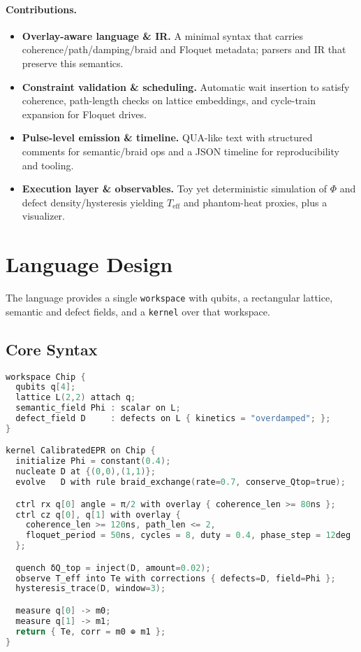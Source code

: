 \documentclass[11pt]{article}
\newcommand{\Teff}{T_{\mathrm{eff}}}
\newcommand{\Phif}{\Phi}
\begin{document}
\paragraph{Contributions.}
\begin{itemize}[leftmargin=1.3em]
  \item \textbf{Overlay-aware language \& IR.} A minimal syntax that carries coherence/path/damping/braid and Floquet metadata; parsers and IR that preserve this semantics.
  \item \textbf{Constraint validation \& scheduling.} Automatic wait insertion to satisfy coherence, path-length checks on lattice embeddings, and cycle-train expansion for Floquet drives.
  \item \textbf{Pulse-level emission \& timeline.} QUA-like text with structured comments for semantic/braid ops and a JSON timeline for reproducibility and tooling.
  \item \textbf{Execution layer \& observables.} Toy yet deterministic simulation of $\Phif$ and defect density/hysteresis yielding $\Teff$ and phantom-heat proxies, plus a visualizer.
\end{itemize}

\section{Language Design}
\label{sec:language}
The language provides a single \texttt{workspace} with qubits, a rectangular lattice, semantic and defect fields, and a \texttt{kernel} over that workspace.

\subsection{Core Syntax}
\begin{lstlisting}[language=C, basicstyle=\ttfamily\small, frame=single]
workspace Chip {
  qubits q[4];
  lattice L(2,2) attach q;
  semantic_field Phi : scalar on L;
  defect_field D     : defects on L { kinetics = "overdamped"; };
}

kernel CalibratedEPR on Chip {
  initialize Phi = constant(0.4);
  nucleate D at {(0,0),(1,1)};
  evolve   D with rule braid_exchange(rate=0.7, conserve_Qtop=true);

  ctrl rx q[0] angle = π/2 with overlay { coherence_len >= 80ns };
  ctrl cz q[0], q[1] with overlay {
    coherence_len >= 120ns, path_len <= 2,
    floquet_period = 50ns, cycles = 8, duty = 0.4, phase_step = 12deg
  };

  quench δQ_top = inject(D, amount=0.02);
  observe T_eff into Te with corrections { defects=D, field=Phi };
  hysteresis_trace(D, window=3);

  measure q[0] -> m0;
  measure q[1] -> m1;
  return { Te, corr = m0 ⊕ m1 };
}
\end{lstlisting}
\end{document}

